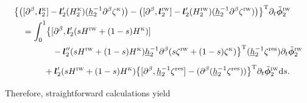 \documentclass[11pt,leqno]{article}
\numberwithin{equation}{section}
\numberwithin{figure}{section}
\begin{document}
\begin{align*}
& \bigl\{ 
 \bigl( [\partial^\beta, \bm{l}_2^{\mbox{\rm\tiny K}}]
  - \bm{l}_2'(H_2^{\mbox{\rm\tiny K}})(\underline{h}_2^{-1}\partial^\beta\zeta^{\mbox{\rm\tiny K}}) \bigr) 
 - \bigl( [\partial^\beta, \bm{l}_2^{\mbox{\rm\tiny IW}}]
  - \bm{l}_2'(H_2^{\mbox{\rm\tiny IW}})(\underline{h}_2^{-1}\partial^\beta\zeta^{\mbox{\rm\tiny IW}}) \bigr) \bigr\}^\mathrm{T}
  \partial_t\tilde{\bm{\phi}}_2^{\mbox{\rm\tiny IW}} \\
&\makebox[1em]{}= \int_0^1
 \bigl\{ [\partial^\beta, \bm{l}_2'(sH^{\mbox{\rm\tiny IW}}+(1-s)H^{\mbox{\rm\tiny K}})] \\
&\makebox[4.5em]{}
  - \bm{l}_2''(sH^{\mbox{\rm\tiny IW}}+(1-s)H^{\mbox{\rm\tiny K}})
   \underline{h}_2^{-1}\partial^\beta( s\zeta^{\mbox{\rm\tiny IW}}+(1-s)\zeta^{\mbox{\rm\tiny K}} )
   \bigr\}^\mathrm{T}(\underline{h}_2^{-1}\zeta^\mathrm{res})\partial_t\tilde{\bm{\phi}}_2^{\mbox{\rm\tiny IW}} \\
&\makebox[1em]{}\phantom{= \int_0^1}
 + \bm{l}_2'(sH^{\mbox{\rm\tiny IW}}+(1-s)H^{\mbox{\rm\tiny K}})
  \bigl\{ [\partial^\beta,\underline{h}_2^{-1}\zeta^\mathrm{res}]
   - (\partial^\beta(\underline{h}_2^{-1}\zeta^\mathrm{res})) \bigr\}^\mathrm{T}\partial_t\tilde{\bm{\phi}}_2^{\mbox{\rm\tiny IW}}
  \mathrm{d}s.
\end{align*}
%
Therefore, straightforward calculations yield 
%
\end{document}
